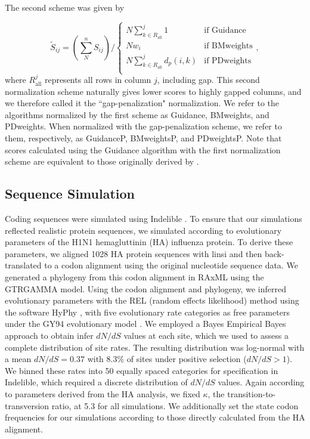 \documentclass[10pt]{article}
\begin{document}
The second scheme was given by 

\begin{equation} \widetilde{S}_{ij} = (\sum_N^n S_{ij}) \bigg/ \left\{ \begin{array}{rl}
              N\sum\limits_{k \in R_\text{all}}^j 1                                  &\mbox{if Guidance} \\
              Nw_i                                                                                     &\mbox{if BMweights} \\
   		  N\sum\limits_{k \in R_\text{all}}^j d_p(i,k)                      &\mbox{if PDweights} \\          
         \end{array} \right.,
\end{equation}
where $R_\text{all}^j$ represents all rows in column $j$, including gap. This second normalization scheme naturally gives lower scores to highly gapped columns, and we therefore called it the ``gap-penalization" normalization. We refer to the algorithms normalized by the first scheme as Guidance, BMweights, and PDweights. When normalized with the gap-penalization scheme, we refer to them, respectively, as GuidanceP, BMweightsP, and PDweightsP. Note that scores calculated using the Guidance algorithm with the first normalization scheme are equivalent to those originally derived by \citet{Penn2010}. 



\subsection*{Sequence Simulation}
Coding sequences were simulated using Indelible \citep{Fletcher2009}. To ensure that our simulations reflected realistic protein sequences, we simulated according to evolutionary parameters of the H1N1 hemagluttinin (HA) influenza protein. To derive these parameters, we aligned 1028 HA protein sequences with linsi \citep{Katoh2005} and then back-translated to a codon alignment using the original nucleotide sequence data. We generated a phylogeny from this codon alignment in RAxML \citep{Stamatakis2006} using the GTRGAMMA model. Using the codon alignment and phylogeny, we inferred evolutionary parameters with the REL (random effects likelihood)  method \citep{NielsenYang1998} using the software HyPhy \citep{Pond2005}, with five evolutionary rate categories as free parameters under the GY94 evolutionary model \citep{GoldmanYang1994}. We employed a Bayes Empirical Bayes approach \citep{Yang2000} to obtain infer $dN/dS$ values at each site, which we used to assess a complete distribution of site rates. The resulting distribution was log-normal with a mean $dN/dS = 0.37$ with 8.3\% of sites  under positive selection ($dN/dS>1$). We binned these rates into 50 equally spaced categories for specification in Indelible, which required a discrete distribution of $dN/dS$ values. Again according to parameters derived from the HA analysis, we fixed $\kappa$, the transition-to-transversion ratio, at 5.3 for all simulations. We additionally set the state codon frequencies for our simulations according to those directly calculated from the HA alignment. 
\end{document}
